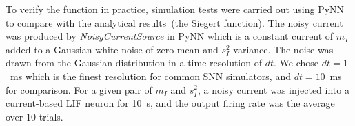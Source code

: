 
	To verify the \DIFdelbegin {}\DIFdelend \DIFaddbegin {}\DIFaddend function in practice, simulation tests were carried out using PyNN~\citep{davison2008pynn} to compare \DIFaddbegin {}\DIFaddend with the analytical results~(the Siegert function).
	The noisy current was produced by \textit{NoisyCurrentSource} in PyNN which is a constant current of $m_I$ added to a Gaussian white noise of zero mean and $s_I^2$ variance.
	The noise was drawn from the Gaussian distribution in a time resolution of $dt$.
	We chose $dt=1$~ms which is the finest resolution for common SNN simulators, and $dt=10$~ms for comparison.
	For a given pair of $m_I$ and $s_I^2$, a noisy current was injected into a current-based LIF neuron for 10~s, and the output firing rate was the average over 10 trials.

